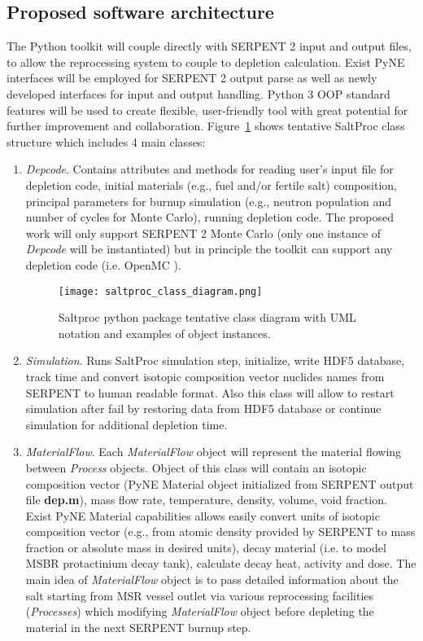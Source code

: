 \subsection{Proposed software architecture}
The Python toolkit will couple directly with SERPENT 2 input and output files, 
to allow the reprocessing system to couple to depletion calculation. Exist 
PyNE interfaces will be employed for SERPENT 2 output parse as well as 
newly developed interfaces for input and output handling. Python 3 \gls{OOP} 
standard features will be used to create flexible, user-friendly tool with 
great potential for further improvement and collaboration. 
Figure~\ref{fig:saltproc_class} shows tentative SaltProc class structure 
 which includes 4 main classes:
\begin{enumerate}
	\item \textit{Depcode}. Contains attributes and methods for 
	reading user's input file for depletion code, initial materials (e.g., 
	fuel and/or fertile salt) composition, principal parameters for 
	burnup simulation (e.g., neutron population and number of cycles for Monte 
	Carlo), running depletion code. The proposed work will only support SERPENT 2 
	Monte Carlo (only 
	one instance of \textit{Depcode} will be instantiated) but in principle the 
	toolkit can support any depletion code (i.e. OpenMC 
	\cite{romano_openmc_2015}).
\begin{figure}[ht!] %
  \texttt{[image: saltproc\_class\_diagram.png]}
  \caption{Saltproc python package tentative class diagram with UML notation 
  and examples of object instances.}
  \label{fig:saltproc_class}
\end{figure}
	\item \textit{Simulation}. Runs SaltProc simulation step, 
	initialize, write HDF5 database, track time and convert 
	isotopic composition vector nuclides names from SERPENT to human 
	readable format. Also this class will allow to restart simulation after 
	fail by restoring data from HDF5 database or continue simulation for 
	additional depletion time.
	
	\item \textit{MaterialFlow}. Each \textit{MaterialFlow} object 
	will represent the material flowing between \textit{Process} objects. Object 
	of this class will contain an isotopic composition vector (PyNE Material object 
	initialized	from SERPENT output file \textbf{dep.m}), mass flow rate, 
	temperature, density, volume, void fraction. Exist PyNE Material 
	capabilities allows easily convert units of isotopic composition vector 
	(e.g., from atomic density provided by SERPENT to mass fraction or absolute 
	mass in desired units), decay 
	material (i.e. to model \gls{MSBR} protactinium decay tank), calculate 
	decay heat, activity and dose. The main idea of \textit{MaterialFlow} 
	object is to pass detailed information about the salt starting from 
	\gls{MSR} vessel outlet via various reprocessing facilities 
	(\textit{Processes}) which modifying \textit{MaterialFlow} object before 
	depleting the material in the next SERPENT burnup step.
		

\end{enumerate}
